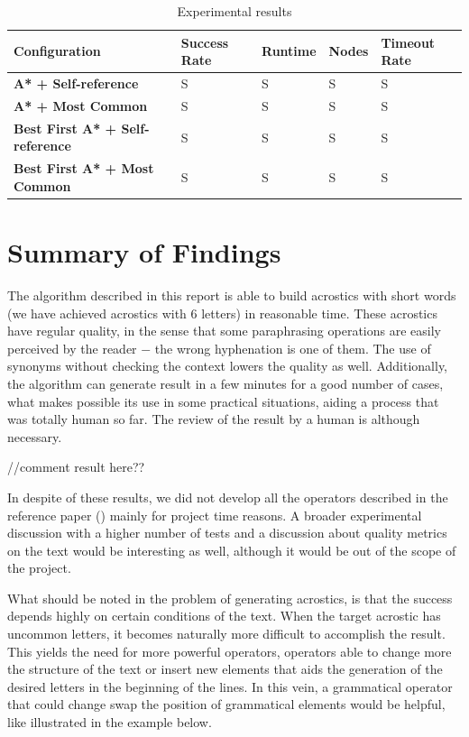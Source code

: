 \documentclass{reportAlternative}
\begin{document}
\begin{table}
\centering
\begin{tabular}{l | l | l | l | l}
	\hline
	\textbf{Configuration} & \textbf{Success Rate} & \textbf{Runtime} & \textbf{Nodes} & \textbf{Timeout Rate} \\ \hline
		\textbf{A* + Self-reference}	& S	& S	& S	& S \\ \hline
		\textbf{A* + Most Common}		& S	& S	& S	& S \\ \hline
		\textbf{Best First A* + Self-reference}	& S & S	& S	& S \\ \hline
		\textbf{Best First A* + Most Common}	& S & S	& S	& S \\
	\hline
\end{tabular}
\label{tab:results}
\caption{Experimental results}
\end{table}


\chapter{Summary of Findings}
The algorithm described in this report is able to build acrostics with short words (we have achieved acrostics with 6 letters) in reasonable time. These acrostics have regular quality, in the sense that some paraphrasing operations are easily perceived by the reader $-$ the wrong hyphenation is one of them. The use of synonyms without checking the context lowers the quality as well. Additionally, the algorithm can generate result in a few minutes for a good number of cases, what makes possible its use in some practical situations, aiding a process that was totally human so far. The review of the result by a human is although necessary. \par

//comment result here??\par

In despite of these results, we did not develop all the operators described in the reference paper (\cite{Stein}) mainly for project time reasons. A broader experimental discussion with a higher number of tests and a discussion about quality metrics on the text would be interesting as well, although it would be out of the scope of the project. \par

What should be noted in the problem of generating acrostics, is that the success depends highly on certain conditions of the text. When the target acrostic has uncommon letters, it becomes naturally more difficult to accomplish the result. This yields the need for more powerful operators, operators able to change more the structure of the text or insert new elements that aids the generation of the desired letters in the beginning of the lines. In this vein, a grammatical operator that could change swap the position of grammatical elements would be helpful, like illustrated in the example below. \par
\end{document}
